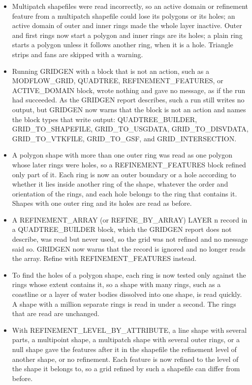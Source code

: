 \begin{itemize}[label=--]
  \item Multipatch shapefiles were read incorrectly, so an active domain or refinement feature from a multipatch shapefile could lose its polygons or its holes; an active domain of outer and inner rings made the whole layer inactive. Outer and first rings now start a polygon and inner rings are its holes; a plain ring starts a polygon unless it follows another ring, when it is a hole. Triangle strips and fans are skipped with a warning.
  \item Running GRIDGEN with a block that is not an action, such as a MODFLOW\_GRID, QUADTREE, REFINEMENT\_FEATURES, or ACTIVE\_DOMAIN block, wrote nothing and gave no message, as if the run had succeeded. As the GRIDGEN report describes, such a run still writes no output, but GRIDGEN now warns that the block is not an action and names the block types that write output: QUADTREE\_BUILDER, GRID\_TO\_SHAPEFILE, GRID\_TO\_USGDATA, GRID\_TO\_DISVDATA, GRID\_TO\_VTKFILE, GRID\_TO\_GSF, and GRID\_INTERSECTION.
  \item A polygon shape with more than one outer ring was read as one polygon whose later rings were holes, so a REFINEMENT\_FEATURES block refined only part of it. Each ring is now an outer boundary or a hole according to whether it lies inside another ring of the shape, whatever the order and orientation of the rings, and each hole belongs to the ring that contains it. Shapes with one outer ring and its holes are read as before.
  \item A REFINEMENT\_ARRAY (or REFINE\_BY\_ARRAY) LAYER n record in a QUADTREE\_BUILDER block, which the GRIDGEN report does not describe, was read but never used, so the grid was not refined and no message said so. GRIDGEN now warns that the record is ignored and no longer reads the array. Refine with REFINEMENT\_FEATURES instead.
  \item To find the holes of a polygon shape, each ring is now tested only against the rings whose extent contains it, so a shape with many rings, such as a coastline or a layer of water bodies dissolved into one shape, is read quickly. A shape with a million separate rings is read in under a second. The rings that are read are unchanged.
  \item With REFINEMENT\_LEVEL\_BY\_ATTRIBUTE, a line shape with several parts, a multipoint shape, a multipatch shape with several outer rings, or a null shape gave the features after it in the shapefile the refinement level of another shape, or no refinement. Each feature is now refined to the level of the shape it belongs to, so a grid refined by such a shapefile can differ from before.

\end{itemize}

